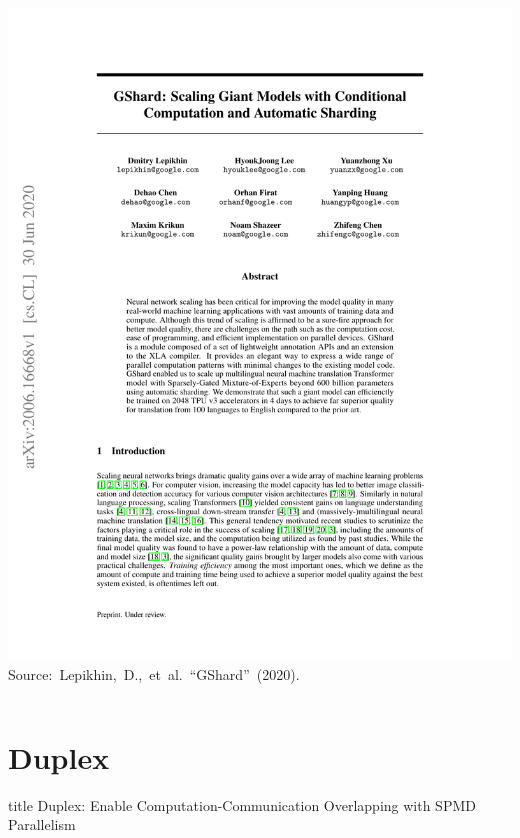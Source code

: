 \documentclass[12pt,aspectratio=169]{beamer}
\begin{document}
\begin{frame}
\begin{columns}
\begin{column}{0.5\textwidth}
                \includegraphics[page=5,trim=10.5cm 16.8cm 4cm 3cm,clip,scale=0.83]{GShard.pdf}
                \hbox{\tiny Source: Lepikhin, D., et al.~``GShard'' (2020).}
            \end{column}
        \end{columns}
    \end{frame}


    \section*{Duplex}

    \begin{frame}
        \centering
        \begin{beamercolorbox}[sep=8pt,center,shadow=true,rounded=true]{title}
          Duplex: Enable Computation-Communication Overlapping with SPMD Parallelism\par%
        \end{beamercolorbox}
    \end{frame}
\end{document}
